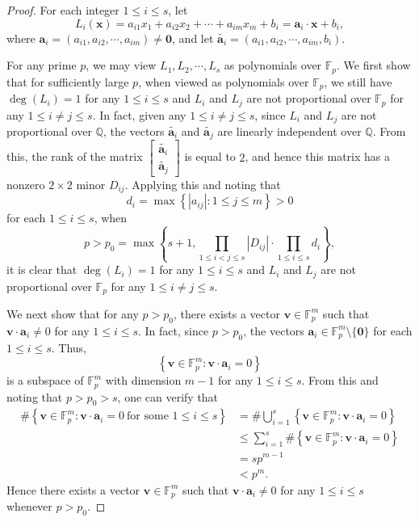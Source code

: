 \documentclass[10pt,a4paper]{amsart}
\def\a{{\bm a}}
\def\v{{\bm v}}
\def\x{{\bm x}}
\def\0{{\bm 0}}
\begin{document}
	\begin{proof}
		For each integer $1\le i\le s$, let 
		$$L_i(\x)=a_{i1}x_1+a_{i2}x_2+\cdots+a_{im}x_m+b_i=\a_i\cdot \x+b_i,$$
		where $\a_i=(a_{i1},a_{i2},\cdots,a_{im})\neq \0$, and let $\widetilde{\a_i}=(a_{i1},a_{i2},\cdots,a_{im},b_i)$. 
		
		For any prime $p$, we may view $L_1, L_2, \cdots,L_s$ as polynomials over $\mathbb{F}_p$. We first show that for sufficiently large $p$, when viewed as polynomials over $\mathbb{F}_p$, we still have $\deg(L_i)=1$ for any $1\le i\le s$ and $L_i$ and $L_j$ are not proportional over $\mathbb{F}_p$ for any $1\le i\neq j\le s$. In fact, given any $1\le i\neq j\le s$, since $L_i$ and $L_j$ are not proportional over $\mathbb{Q}$, the vectors $\widetilde{\a_i}$ and $\widetilde{\a_j}$ are linearly independent over $\mathbb{Q}$. From this, the rank of the matrix $\begin{bmatrix}
			\widetilde{\a_i}\\
			\widetilde{\a_j}
		\end{bmatrix}$ is equal to $2$, and hence this matrix
		has a nonzero $2\times 2$ minor $D_{ij}$. Applying this and noting that 
		$$d_i=\max\left\{|a_{ij}|: 1\le j\le m\right\}>0$$
		for each $1\le i\le s$, 
		 when 
		$$p>p_0=\max\left\{s+1, \prod_{1\le i<j\le s}|D_{ij}|\cdot \prod_{1\le i\le s}d_i\right\},$$
		it is clear that $\deg(L_i)=1$ for any $1\le i\le s$ and $L_i$ and $L_j$ are not proportional over $\mathbb{F}_p$ for any $1\le i\neq j\le s$.
		
		We next show that for any $p>p_0$, there exists a vector $\v\in\mathbb{F}_p^m$ such that $\v\cdot \a_i\neq 0$ for any $1\le i\le s$. In fact, since $p>p_0$, the vectors $\a_i\in\mathbb{F}_p^m\setminus\{\0\}$ for each $1\le i\le s$. Thus, 
		$$\left\{\v\in\mathbb{F}_p^m: \v\cdot \a_i=0\right\}$$
		is a subspace of $\mathbb{F}_p^m$ with dimension $m-1$ for any $1\le i\le s$. From this and noting that $p>p_0>s$, one can verify that 
		\begin{align*}
			\#\left\{\v\in\mathbb{F}_p^m: \v\cdot \a_i=0\ \text{for some $1\le i\le s$}\right\}
&=\#\bigcup_{i=1}^s\left\{\v\in\mathbb{F}_p^m: \v\cdot \a_i=0\right\}\\
&\le \sum_{i=1}^s\#\left\{\v\in\mathbb{F}_p^m: \v\cdot \a_i=0\right\}\\
&=sp^{m-1}\\
&<p^m.
		\end{align*}
		Hence there exists a vector $\v\in\mathbb{F}_p^m$ such that $\v\cdot \a_i\neq 0$ for any $1\le i\le s$ whenever $p>p_0$. 
		

\end{proof}
\end{document}
